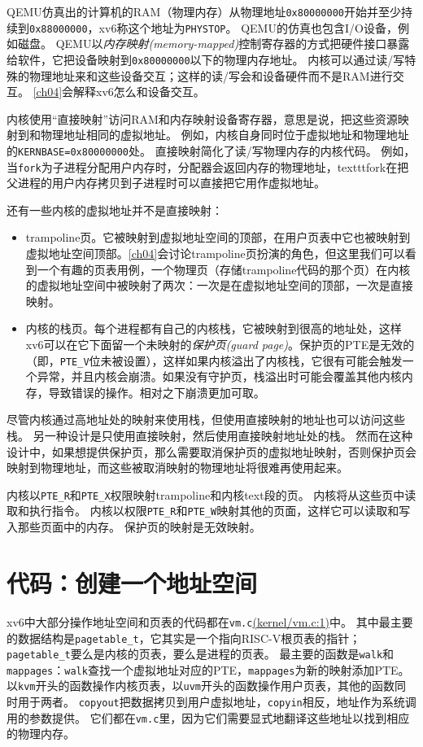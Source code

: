 QEMU仿真出的计算机的RAM（物理内存）从物理地址\texttt{0x80000000}开始并至少持续到\texttt{0x88000000}，xv6称这个地址为\texttt{PHYSTOP}。
QEMU的仿真也包含I/O设备，例如磁盘。
QEMU以\emph{内存映射(memory-mapped)}控制寄存器的方式把硬件接口暴露给软件，它把设备映射到\texttt{0x80000000}以下的物理内存地址。
内核可以通过读/写特殊的物理地址来和这些设备交互；这样的读/写会和设备硬件而不是RAM进行交互。
\autoref{ch04}会解释xv6怎么和设备交互。

内核使用“直接映射”访问RAM和内存映射设备寄存器，意思是说，把这些资源映射到和物理地址相同的虚拟地址。
例如，内核自身同时位于虚拟地址和物理地址的\texttt{KERNBASE=0x80000000}处。
直接映射简化了读/写物理内存的内核代码。
例如，当\texttt{fork}为子进程分配用户内存时，分配器会返回内存的物理地址，texttt{fork}在把父进程的用户内存拷贝到子进程时可以直接把它用作虚拟地址。

还有一些内核的虚拟地址并不是直接映射：
\begin{itemize}
    \item trampoline页。它被映射到虚拟地址空间的顶部，在用户页表中它也被映射到虚拟地址空间顶部。\autoref{ch04}会讨论trampoline页扮演的角色，但这里我们可以看到一个有趣的页表用例，一个物理页（存储trampoline代码的那个页）在内核的虚拟地址空间中被映射了两次：一次是在虚拟地址空间的顶部，一次是直接映射。
    \item 内核的栈页。每个进程都有自己的内核栈，它被映射到很高的地址处，这样xv6可以在它下面留一个未映射的\emph{保护页(guard page)}。保护页的PTE是无效的（即，\texttt{PTE\_V}位未被设置），这样如果内核溢出了内核栈，它很有可能会触发一个异常，并且内核会崩溃。如果没有守护页，栈溢出时可能会覆盖其他内核内存，导致错误的操作。相对之下崩溃更加可取。
\end{itemize}

尽管内核通过高地址处的映射来使用栈，但使用直接映射的地址也可以访问这些栈。
另一种设计是只使用直接映射，然后使用直接映射地址处的栈。
然而在这种设计中，如果想提供保护页，那么需要取消保护页的虚拟地址映射，否则保护页会映射到物理地址，而这些被取消映射的物理地址将很难再使用起来。

内核以\texttt{PTE\_R}和\texttt{PTE\_X}权限映射trampoline和内核text段的页。
内核将从这些页中读取和执行指令。
内核以权限\texttt{PTE\_R}和\texttt{PTE\_W}映射其他的页面，这样它可以读取和写入那些页面中的内存。
保护页的映射是无效映射。

\section{代码：创建一个地址空间}
xv6中大部分操作地址空间和页表的代码都在\texttt{vm.c}\href{https://github.com/mit-pdos/xv6-riscv/blob/risc/kernel/vm.c#L1}{(kernel/vm.c:1)}中。
其中最主要的数据结构是\texttt{pagetable\_t}，它其实是一个指向RISC-V根页表的指针；\texttt{pagetable\_t}要么是内核的页表，要么是进程的页表。
最主要的函数是\texttt{walk}和\texttt{mappages}：\texttt{walk}查找一个虚拟地址对应的PTE，\texttt{mappages}为新的映射添加PTE。
以\texttt{kvm}开头的函数操作内核页表，以\texttt{uvm}开头的函数操作用户页表，其他的函数同时用于两者。
\texttt{copyout}把数据拷贝到用户虚拟地址，\texttt{copyin}相反，地址作为系统调用的参数提供。
它们都在\texttt{vm.c}里，因为它们需要显式地翻译这些地址以找到相应的物理内存。

